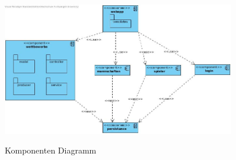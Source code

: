 
\begin{figure}[H]
	\caption{Komponenten Diagramm}
	\includegraphics[width=0.9\textwidth]{content/pictures/komponentendiagramm}
	\label{pic:component_diag}
\end{figure}


